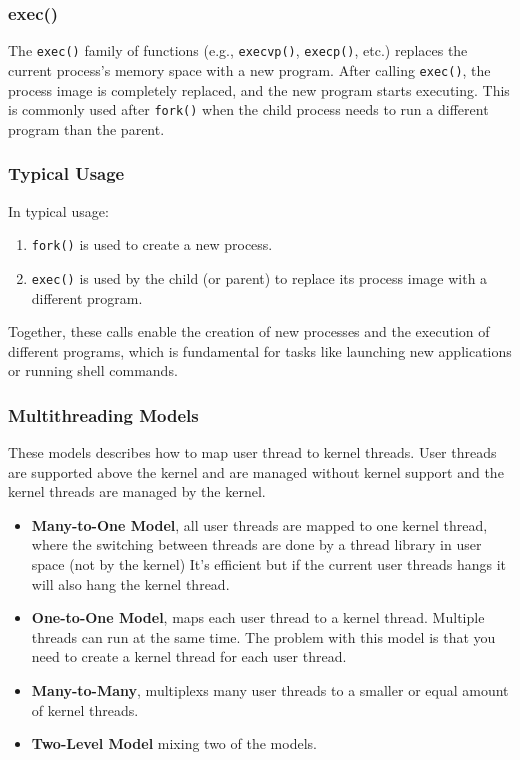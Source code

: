 \documentclass{article}
\begin{document}
\subsubsection*{exec()}
The \texttt{exec()} family of functions (e.g., \texttt{execvp()}, \texttt{execp()}, etc.) replaces the current process’s memory space with a new program. After calling \texttt{exec()}, the process image is completely replaced, and the new program starts executing. This is commonly used after \texttt{fork()} when the child process needs to run a different program than the parent.

\subsubsection*{Typical Usage}
In typical usage:
\begin{enumerate}
    \item \texttt{fork()} is used to create a new process.
    \item \texttt{exec()} is used by the child (or parent) to replace its process image with a different program.
\end{enumerate}

Together, these calls enable the creation of new processes and the execution of different programs, which is fundamental for tasks like launching new applications or running shell commands.



\subsubsection{Multithreading Models}
These models describes how to map user thread to kernel threads. User threads are supported above the kernel and are managed without kernel support and the kernel threads are managed by the kernel.

\begin{itemize}
    \item {\bf Many-to-One Model}, all user threads are mapped to one kernel 
    thread, where the switching between threads are done by a thread library in user space (not by the kernel)
    It's efficient but if the current user threads hangs it will also hang the kernel thread.
    \item {\bf One-to-One Model}, maps each user thread to a kernel thread. Multiple threads can run at the same time. The problem with this model is that you need to create a kernel thread for each user thread.
    \item {\bf Many-to-Many}, multiplexs many user threads to a smaller or equal amount of kernel threads.
    \item {\bf Two-Level Model} mixing two of the models. 
\end{itemize}
\end{document}
